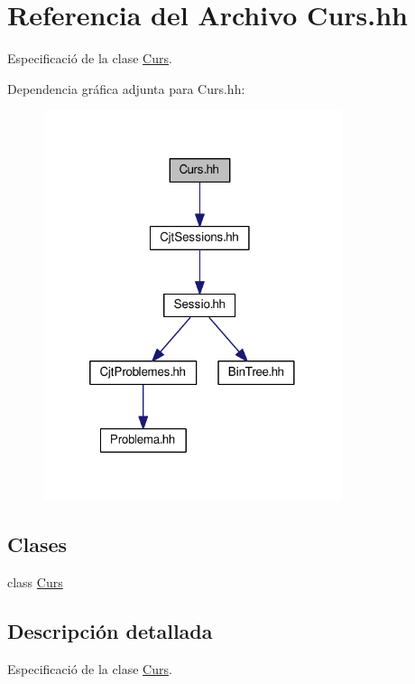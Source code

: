 \hypertarget{_curs_8hh}{}\section{Referencia del Archivo Curs.\+hh}
\label{_curs_8hh}


Especificació de la clase \mbox{\hyperlink{class_curs}{Curs}}.  


Dependencia gráfica adjunta para Curs.\+hh\+:
\nopagebreak
\begin{figure}[H]
\begin{center}
\leavevmode
\includegraphics[width=248pt]{_curs_8hh__incl}
\end{center}
\end{figure}
\subsection*{Clases}
\begin{DoxyCompactItemize}
\item 
class \mbox{\hyperlink{class_curs}{Curs}}
\end{DoxyCompactItemize}


\subsection{Descripción detallada}
Especificació de la clase \mbox{\hyperlink{class_curs}{Curs}}. 

